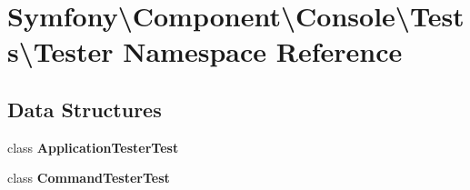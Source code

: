 \section{Symfony\textbackslash{}Component\textbackslash{}Console\textbackslash{}Tests\textbackslash{}Tester Namespace Reference}
\label{namespace_symfony_1_1_component_1_1_console_1_1_tests_1_1_tester}
\subsection*{Data Structures}
\begin{DoxyCompactItemize}
\item 
class {\bf Application\+Tester\+Test}
\item 
class {\bf Command\+Tester\+Test}
\end{DoxyCompactItemize}
